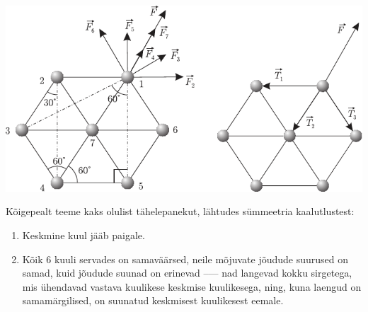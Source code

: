 \documentclass[10pt]{article}
\begin{document}
{%

\solu
\begin{center}
	\includegraphics[width=\linewidth]{2005-lahg-04-lah}
\end{center}

Kõigepealt teeme kaks olulist tähelepanekut, lähtudes sümmeetria kaalutlustest:
\begin{enumerate}[wide=0pt, label={\arabic*)}]
	\item Keskmine kuul jääb paigale.
	\item Kõik 6 kuuli servades on samaväärsed, neile mõjuvate jõudude suurused on samad, kuid jõudude suunad on erinevad –--- nad langevad kokku sirgetega, mis ühendavad vastava kuulikese keskmise kuulikesega, ning, kuna laengud on samamärgilised, on suunatud keskmisest kuulikesest eemale.
\end{enumerate}

}
\end{document}
